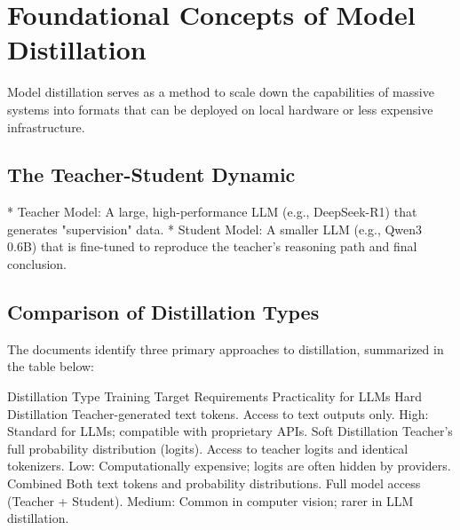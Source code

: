 ﻿\section{Foundational Concepts of Model Distillation}
\label{sec:summary}


Model distillation serves as a method to scale down the capabilities of massive systems into formats that can be deployed on local hardware or less expensive infrastructure.

\subsection{The Teacher-Student Dynamic}

* Teacher Model: A large, high-performance LLM (e.g., DeepSeek-R1) that generates "supervision" data.
* Student Model: A smaller LLM (e.g., Qwen3 0.6B) that is fine-tuned to reproduce the teacher's reasoning path and final conclusion.

\subsection{Comparison of Distillation Types}

The documents identify three primary approaches to distillation, summarized in the table below:

Distillation Type	Training Target	Requirements	Practicality for LLMs
Hard Distillation	Teacher-generated text tokens.	Access to text outputs only.	High: Standard for LLMs; compatible with proprietary APIs.
Soft Distillation	Teacher's full probability distribution (logits).	Access to teacher logits and identical tokenizers.	Low: Computationally expensive; logits are often hidden by providers.
Combined	Both text tokens and probability distributions.	Full model access (Teacher + Student).	Medium: Common in computer vision; rarer in LLM distillation.